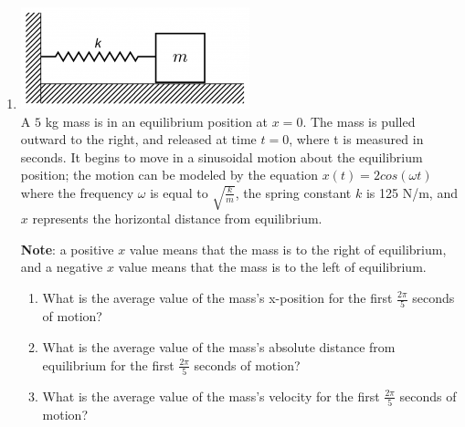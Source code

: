 \documentclass{article}
\begin{document}
\begin{enumerate}
\item 
\vspace{0.3cm}
\includegraphics[scale=0.8]{mass-spring}
\vspace{0.3cm} \\
A $5$ kg mass is in an equilibrium position at $x=0$. The mass is pulled outward to the right, and released at time $t=0$, where t is measured in seconds. It begins to move in a sinusoidal motion about the equilibrium position; the motion can be modeled by the equation $x(t)=2cos(\omega t)$ where the frequency $\omega$ is equal to $\sqrt{\frac{k}{m}}$, the spring constant $k$ is 125 N/m, and $x$ represents the horizontal distance from equilibrium.

\textbf{Note}: a positive $x$ value means that the mass is to the right of equilibrium, and a negative $x$ value means that the mass is to the left of equilibrium.

\begin{enumerate}
\item What is the average value of the mass's x-position for the first $\frac{2\pi}{5}$ seconds of motion?
\item What is the average value of the mass's absolute distance from equilibrium for the
first $\frac{2\pi}{5}$  seconds of motion?
\item What is the average value of the mass's velocity for
the first $\frac{2\pi}{5}$ seconds of motion?
\end{enumerate}
\end{enumerate}
\end{document}
